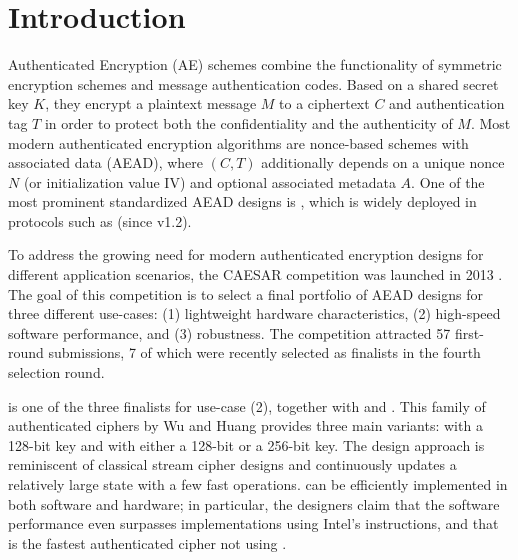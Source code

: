 
\section{Introduction}
\label{sec/Introduction}

Authenticated Encryption (AE) schemes combine the functionality of symmetric encryption schemes and message authentication codes.
Based on a shared secret key $K$, they encrypt a plaintext message $M$ to a ciphertext $C$ and authentication tag $T$ in order to protect both the confidentiality and the authenticity of $M$.
Most modern authenticated encryption algorithms are nonce-based schemes with associated data (AEAD),
where $(C, T)$ additionally depends on a unique nonce $N$ (or initialization value IV) and optional associated metadata $A$.
One of the most prominent standardized AEAD designs is  \cite{indocryptMcGrewV04,nistDworkin07},
which is widely deployed in protocols such as  (since v1.2).

To address the growing need for modern authenticated encryption designs for different application scenarios, 
the CAESAR competition was launched in 2013 \cite{CAESAR}.
The goal of this competition is to select a final portfolio of AEAD designs for three different use-cases:
(1) lightweight hardware characteristics,
(2) high-speed software performance, and
(3) robustness.
The competition attracted 57 first-round submissions, 7 of which were recently selected as finalists in the fourth selection round.

\morus is one of the three finalists for use-case (2), together with  and .
This family of authenticated ciphers by Wu and Huang \cite{MORUS} provides three main variants:
\morus[640] with a 128-bit key and \morus[1280] with either a 128-bit or a 256-bit key.
The design approach is reminiscent of classical stream cipher designs and
continuously updates a relatively large state with a few fast operations.
\morus can be efficiently implemented in both software and hardware;
in particular, the designers claim that the software performance even surpasses
 implementations using Intel's  instructions,
and that \morus is the fastest authenticated cipher not using  \cite{MORUS}.

